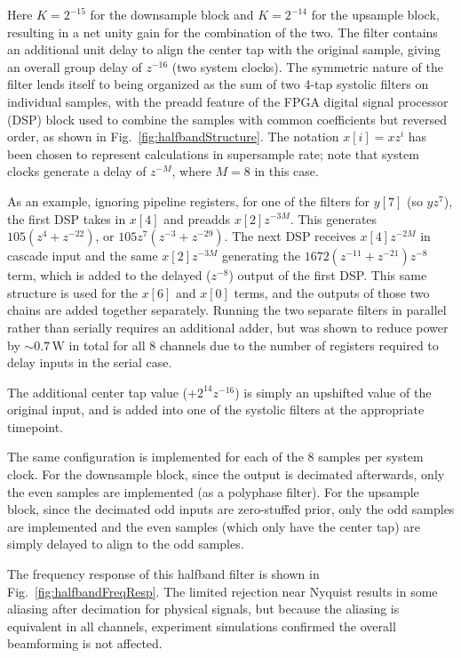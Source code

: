 \documentclass{IEEEtran}
\begin{document}
Here $K=2^{-15}$ for the downsample block and $K=2^{-14}$ for the
upsample block, resulting in a net unity gain for the combination of the
two. The filter contains an additional unit delay to align the center tap
with the original sample, giving an overall group delay of $z^{-16}$
(two system clocks). The symmetric nature of the filter lends itself to being
organized as the sum of two 4-tap systolic filters on individual samples,
with the preadd feature of the FPGA digital signal processor (DSP) block 
used to combine the samples with common coefficients but reversed order, 
as shown in Fig.~\ref{fig:halfbandStructure}. The notation $x[i]=x z^{i}$ 
has been chosen to represent calculations in supersample rate; note that
system clocks generate a delay of $z^{-M}$, where $M=8$ in this case.

As an example, ignoring pipeline registers, for one of the filters for
$y[7]$ (so $yz^7$), the first DSP takes in $x[4]$ and preadds $x[2]z^{-3M}$. This
generates $105\left(z^{4}+z^{-22}\right)$, or $105z^7\left(z^{-3}+z^{-29}\right)$. The
next DSP receives $x[4]z^{-2M}$ in cascade input and the same $x[2]z^{-3M}$
generating the $1672\left(z^{-11}+z^{-21}\right)z^{-8}$ term,
which is added to the delayed ($z^{-8}$) output of the first DSP.
This same structure is used for the $x[6]$ and $x[0]$ terms, and the
outputs of those two chains are added together separately. Running the
two separate filters in parallel rather than serially requires an
additional adder, but was shown to reduce power by $\sim0.7\,\text{W}$ in total
for all 8 channels due to the number of registers required to delay
inputs in the serial case.

The additional center tap value ($+2^{14}z^{-16}$) is simply
an upshifted value of the original input, and is added into one of the
systolic filters at the appropriate timepoint.

The same configuration is implemented for each of the 8 samples per
system clock. For the downsample block, since the output is decimated
afterwards, only the even samples are implemented (as a polyphase
filter). For the upsample block, since the decimated odd inputs are
zero-stuffed prior, only the odd samples are implemented and the
even samples (which only have the center tap) are simply delayed
to align to the odd samples.

The frequency response of this halfband filter is shown in
Fig.~\ref{fig:halfbandFreqResp}. The limited rejection near Nyquist
results in some aliasing after decimation for physical signals, but
because the aliasing is equivalent in all channels, experiment simulations
confirmed the overall beamforming is not affected.
\end{document}
